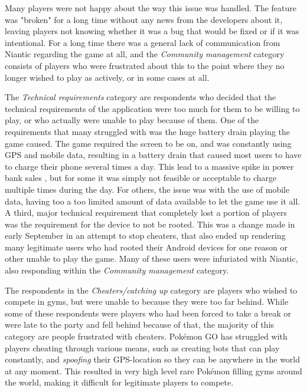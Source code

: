 Many players were not happy about the way this issue was handled. The feature was "broken" for a long time without any news from the developers about it, leaving players not knowing whether it was a bug that would be fixed or if it was intentional. For a long time there was a general lack of communication from Niantic regarding the game at all, and the \emph{Community management} category consists of players who were frustrated about this to the point where they no longer wished to play as actively, or in some cases at all.

The \emph{Technical requirements} category are respondents who decided that the technical requirements of the application were too much for them to be willing to play, or who actually were unable to play because of them. One of the requirements that many struggled with was the huge battery drain playing the game caused. The game required the screen to be on, and was constantly using GPS and mobile data, resulting in a battery drain that caused most users to have to charge their phone several times a day. This lead to a massive spike in power bank sales , but for some it was simply not feasible or acceptable to charge multiple times during the day. For others, the issue was with the use of mobile data, having too a too limited amount of data available to let the game use it all. A third, major technical requirement that completely lost a portion of players was the requirement for the device to not be rooted. This was a change made in early September in an attempt to stop cheaters, that also ended up rendering many legitimate users who had rooted their Android devices for one reason or other unable to play the game. Many of these users were infuriated with Niantic, also responding within the \emph{Community management} category.

The respondents in the \emph{Cheaters/catching up} category are players who wished to compete in gyms, but were unable to because they were too far behind. While some of these respondents were players who had been forced to take a break or were late to the party and fell behind because of that, the majority of this category are people frustrated with cheaters. Pokémon GO has struggled with players cheating through various means, such as creating bots that can play constantly, and \emph{spoofing} their GPS-location so they can be anywhere in the world at any moment. This resulted in very high level rare Pokémon filling gyms around the world, making it difficult for legitimate players to compete.

